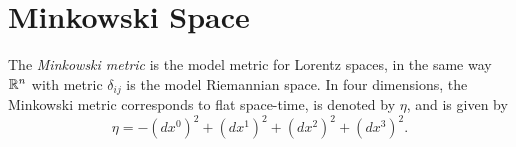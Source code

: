 \section{Minkowski Space}\label{sec:Minkowski}
 The \textit{Minkowski metric} is the model metric for Lorentz spaces, in the same way ${\mathbb R}^n$ with metric $\delta_{ij}$ is the model Riemannian space. In four dimensions, the Minkowski metric corresponds to flat space-time, is denoted by $\eta$, and is given by
\begin{equation} \eta = -(d x^0)^2 + (d x^1)^2 + (d x^2)^2 + (d x^3)^2 .\label{eq:MinkMetric} \end{equation}

